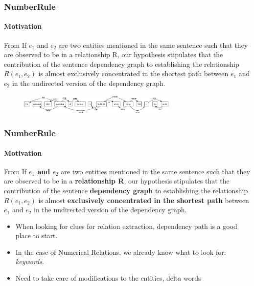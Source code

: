 \documentclass{beamer}
\begin{document}
\begin{frame}
\frametitle{NumberRule}
\framesubtitle{Motivation}

\begin{block}{From \cite{shortestpathdep}}
If $e_1$ and $e_2$ are two entities mentioned in the same
 sentence such that they are observed to be in a relationship R, our hypothesis stipulates that the contribution of the sentence dependency graph to establishing the relationship $R(e_1, e_2)$ is almost exclusively concentrated in the shortest path between $e_1$ and $e_2$ in the undirected version of the dependency graph.
\end{block}
\begin{figure}
\includegraphics[width=0.7\textwidth]{images/dep.eps}
\end{figure}

\end{frame}


\begin{frame}
\frametitle{NumberRule}
\framesubtitle{Motivation}

\begin{block}{From \cite{shortestpathdep}}
If \textbf{$e_1$ and $e_2$ }are two entities mentioned in the same
 sentence such that they are observed to be in a \textbf{relationship R}, our hypothesis stipulates that the contribution of the sentence \textbf{dependency graph} to establishing the relationship $R(e_1, e_2)$ is almost \textbf{exclusively concentrated in the shortest path} between $e_1$ and $e_2$ in the undirected version of the dependency graph.
\end{block}
\begin{itemize}
\item When looking for clues for relation extraction, dependency path is a good place to start.
\item In the case of Numerical Relations, we already know what to look for: \textit{keywords}.
\item Need to take care of modifications to the entities, delta words
\end{itemize}
\end{frame}

\end{document}
